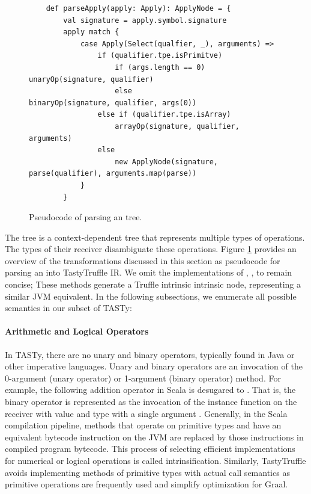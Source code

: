 \begin{figure}[!htb]
	\begin{verbatim}
	def parseApply(apply: Apply): ApplyNode = {
		val signature = apply.symbol.signature
		apply match {
			case Apply(Select(qualfier, _), arguments) => 
				if (qualifier.tpe.isPrimitve)
					if (args.length == 0) unaryOp(signature, qualifier)
					else                  binaryOp(signature, qualifier, args(0))
				else if (qualifier.tpe.isArray)
					arrayOp(signature, qualifier, arguments)
				else 
					new ApplyNode(signature, parse(qualifier), arguments.map(parse))	
			}
		}
	\end{verbatim}
	\caption{Pseudocode of parsing an  tree.}
	\label{impl:parse-apply}
\end{figure}
The  tree is a context-dependent tree that represents multiple types of operations.
The types of their receiver disambiguate these operations.
Figure \ref{impl:parse-apply} provides an overview of the transformations discussed in this section as pseudocode for parsing an  into TastyTruffle IR.
We omit the implementations of , ,  to remain concise; 
These methods generate a Truffle intrinsic intrinsic node, representing a similar JVM equivalent.
In the following subsections, we enumerate all possible semantics in our subset of TASTy:

\paragraph{Arithmetic and Logical Operators}

In TASTy, there are no unary and binary operators, typically found in Java or other imperative languages.
Unary and binary operators are an invocation of the 0-argument (unary operator) or 1-argument (binary operator) method. 
For example, the following addition operator in Scala  is desugared to . 
That is, the binary operator \scalainline{+} is represented as the invocation of the instance function  on the receiver with value  and type  with a single argument .
Generally, in the Scala compilation pipeline, methods that operate on primitive types and have an equivalent bytecode instruction on the JVM\cite{java:vm-spec} are replaced by those instructions in compiled program bytecode. 
This process of selecting efficient implementations for numerical or logical operations is called intrinsification.
Similarly, TastyTruffle avoids implementing methods of primitive types with actual call semantics as primitive operations are frequently used and simplify optimization for Graal.

